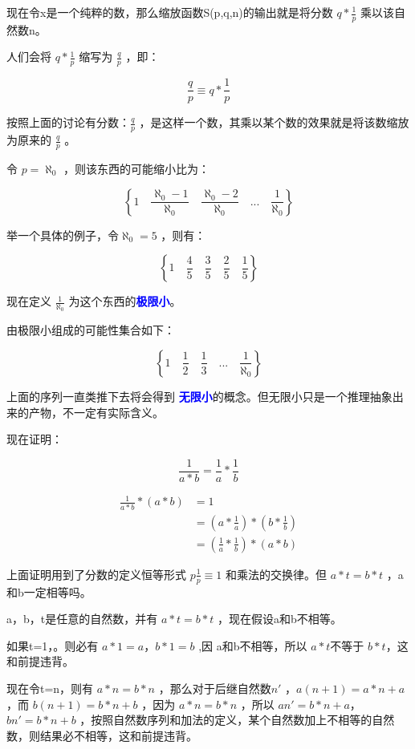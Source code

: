 \documentclass[12pt,oneside]{book}
\renewcommand{\emph}[1]{\textcolor{blue}{\textbf{#1}}}
\begin{document}
现在令x是一个纯粹的数，那么缩放函数S(p,q,n)的输出就是将分数 $q* \frac{1}{p}$ 乘以该自然数n。

人们会将 $q* \frac{1}{p}$ 缩写为 $\frac{q}{p}$ ，即：

\begin{equation}
\frac{q}{p} \equiv q* \frac{1}{p}
\end{equation}

按照上面的讨论有分数：$\frac{q}{p}$ ，是这样一个数，其乘以某个数的效果就是将该数缩放为原来的 $\frac{q}{p}$ 。


令 $p=\aleph_0$ ，则该东西的可能缩小比为：

\[
\left\{1 \quad \frac{\aleph_0-1}{\aleph_0} \quad \frac{\aleph_0-2}{\aleph_0} \quad  ...  \quad \frac{1}{\aleph_0} \right\}
\]

举一个具体的例子，令$\aleph_0 = 5$ ，则有：

\[
\left\{1 \quad \frac{4}{5} \quad \frac{3}{5} \quad  \frac{2}{5}  \quad \frac{1}{5} \right\}
\]

现在定义 $\frac{1}{\aleph_0}$ 为这个东西的\emph{极限小}。

由极限小组成的可能性集合如下：

\[
\left\{1 \quad \frac{1}{2} \quad \frac{1}{3} \quad  ...  \quad \frac{1}{\aleph_0} \right\}
\]


上面的序列一直类推下去将会得到 \emph{无限小}的概念。但无限小只是一个推理抽象出来的产物，不一定有实际含义。

现在证明：

\begin{equation}
\label{eq:17}
\frac{1}{a*b} = \frac{1}{a} * \frac{1}{b}
\end{equation}

\begin{align*}
\frac{1}{a*b} * (a*b) &=1\\
&= (a*\frac{1}{a}) * (b * \frac{1}{b})\\
&=(\frac{1}{a} * \frac{1}{b}) * (a*b)
\end{align*}

上面证明用到了分数的定义恒等形式 $p\frac{1}{p} \equiv 1$ 和乘法的交换律。但 $a*t=b*t$ ，a和b一定相等吗。

a，b，t是任意的自然数，并有 $a*t=b*t$ ，现在假设a和b不相等。

如果t=1，。则必有 $a*1 =a$，$b*1=b$ ,因 a和b不相等，所以 $a*t$不等于 $b*t$，这和前提违背。

现在令t=n，则有 $a*n = b*n$ ，那么对于后继自然数$n'$ ，$a(n+1)=a*n+a$ ，而 $b(n+1)=b*n+b$ ，因为 $a*n=b*n$ ，所以 $an'=b*n+a$，$bn'=b*n+b$ ，按照自然数序列和加法的定义，某个自然数加上不相等的自然数，则结果必不相等，这和前提违背。
\end{document}
